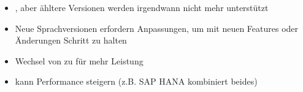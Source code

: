 \begin{infoBox}[title=Programmiersprachen \& deren APIs]
    \begin{itemize}
        \item {}, aber ähltere Versionen werden irgendwann nicht mehr unterstützt
        \item Neue Sprachversionen erfordern Anpassungen, um mit neuen Features oder Änderungen Schritt zu halten
    \end{itemize}
\end{infoBox}
\begin{infoBox}[title=Datenbanktechnologie]
    \begin{itemize}
        \item Wechsel von  zu  für mehr Leistung
        \item {} kann Performance steigern (z.B. SAP HANA kombiniert beides)
    \end{itemize}
\end{infoBox}

